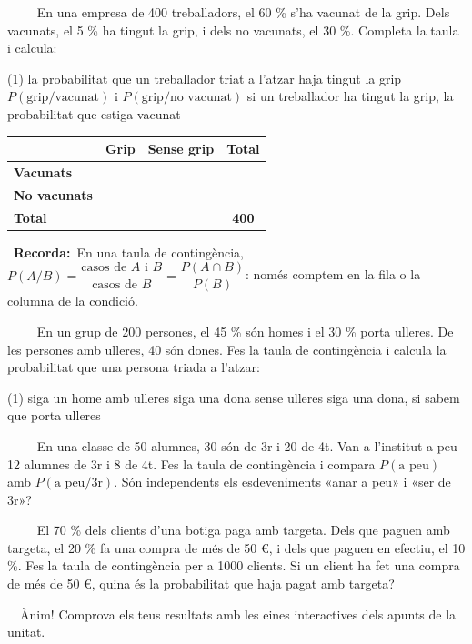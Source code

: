 \documentclass[11pt,a4paper]{article}
\newcommand{\estrelles}[1]{{\color{accent}\ifcase#1\or\faStar\faStar[regular]\faStar[regular]\or\faStar\faStar\faStar[regular]\or\faStar\faStar\faStar\fi}}
\newcounter{exer}
\newcommand{\ex}[1]{\par\needspace{4\baselineskip}\medskip\stepcounter{exer}\noindent{\color{navy}\bfseries\theexer.}\ \ {\small\estrelles{#1}}\ \ }
\newcommand{\recorda}[1]{\par\smallskip\begin{tcolorbox}[colback=accent!7,colframe=accent!55,arc=2mm,boxrule=0.5pt,left=2.5mm,right=2.5mm,top=1mm,bottom=1mm]\small{\color{accent}\faLightbulb[regular]}\ \textbf{Recorda:}\ #1\end{tcolorbox}}
\begin{document}
\ex{2} En una empresa de 400 treballadors, el 60 \% s'ha vacunat de la grip. Dels vacunats, el 5 \% ha tingut la grip, i dels no vacunats, el 30 \%. Completa la taula i calcula:
\begin{tasks}(1)
  \task la probabilitat que un treballador triat a l'atzar haja tingut la grip
  \task $P(\text{grip}/\text{vacunat})$ i $P(\text{grip}/\text{no vacunat})$
  \task si un treballador ha tingut la grip, la probabilitat que estiga vacunat
\end{tasks}
\par\smallskip\begin{center}{\small\renewcommand{\arraystretch}{1.3}\begin{tabular}{l|cc|c}
\rowcolor{soft} & Grip & Sense grip & Total\\\hline
\cellcolor{soft}\textbf{Vacunats} & \phantom{000} & \phantom{000} & \phantom{000}\\
\cellcolor{soft}\textbf{No vacunats} & \phantom{000} & \phantom{000} & \phantom{000}\\\hline
\cellcolor{soft}\textbf{Total} & \phantom{000} & \phantom{000} & \textbf{400}\\
\end{tabular}}\end{center}\recorda{En una taula de contingència, $P(A/B)=\dfrac{\text{casos de }A\text{ i }B}{\text{casos de }B}=\dfrac{P(A\cap B)}{P(B)}$: només comptem en la fila o la columna de la condició.}

\ex{3} En un grup de 200 persones, el 45 \% són homes i el 30 \% porta ulleres. De les persones amb ulleres, 40 són dones. Fes la taula de contingència i calcula la probabilitat que una persona triada a l'atzar:
\begin{tasks}(1)
  \task siga un home amb ulleres
  \task siga una dona sense ulleres
  \task siga una dona, si sabem que porta ulleres
\end{tasks}

\ex{3} En una classe de 50 alumnes, 30 són de 3r i 20 de 4t. Van a l'institut a peu 12 alumnes de 3r i 8 de 4t. Fes la taula de contingència i compara $P(\text{a peu})$ amb $P(\text{a peu}/\text{3r})$. Són independents els esdeveniments «anar a peu» i «ser de 3r»?

\ex{3} El 70 \% dels clients d'una botiga paga amb targeta. Dels que paguen amb targeta, el 20 \% fa una compra de més de 50 €, i dels que paguen en efectiu, el 10 \%. Fes la taula de contingència per a 1000 clients. Si un client ha fet una compra de més de 50 €, quina és la probabilitat que haja pagat amb targeta?

\vfill
\begin{center}\color{muted}\small\faCheckCircle[regular]\ \ Ànim! Comprova els teus resultats amb les eines interactives dels apunts de la unitat.\end{center}
\end{document}
